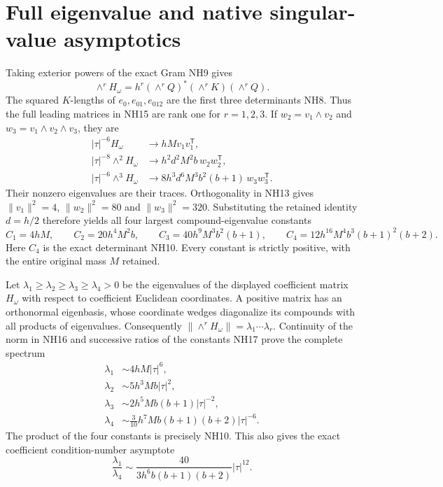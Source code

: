 \documentclass[11pt]{article}
\begin{document}
\section{Full eigenvalue and native singular-value asymptotics}
Taking exterior powers of the exact Gram NH9 gives
\[
 \wedge^rH_\omega
 =h^r(\wedge^rQ)^*(\wedge^rK)(\wedge^rQ).
 \tag{NH15}
\]
The squared $K$-lengths of $e_0,e_{01},e_{012}$ are the first
three determinants NH8. Thus the full leading matrices in
NH15 are rank one for $r=1,2,3$. If $w_2=v_1\wedge v_2$
and $w_3=v_1\wedge v_2\wedge v_3$, they are
\[
\begin{aligned}
 |\tau|^{-6}H_\omega&\longrightarrow hM v_1v_1^{\mathsf T},\\
 |\tau|^{-8}\wedge^2H_\omega&\longrightarrow
              h^2d^2M^2b\,w_2w_2^{\mathsf T},\\
 |\tau|^{-6}\wedge^3H_\omega&\longrightarrow
              8h^3d^6M^3b^2(b+1)\,w_3w_3^{\mathsf T}.
\end{aligned}\tag{NH16}
\]
Their nonzero eigenvalues are their traces. Orthogonality in
NH13 gives $\|v_1\|^2=4$, $\|w_2\|^2=80$ and
$\|w_3\|^2=320$. Substituting the retained identity $d=h/2$
therefore yields all four largest compound-eigenvalue constants
\[
 C_1=4hM,\qquad C_2=20h^4M^2b,\qquad
 C_3=40h^9M^3b^2(b+1),\qquad
 C_4=12h^{16}M^4b^3(b+1)^2(b+2).
 \tag{NH17}
\]
Here $C_4$ is the exact determinant NH10. Every constant is
strictly positive, with the entire original mass $M$ retained.

Let $\lambda_1\ge\lambda_2\ge\lambda_3\ge\lambda_4>0$
be the eigenvalues of the displayed coefficient matrix $H_\omega$
with respect to coefficient Euclidean coordinates. A positive
matrix has an orthonormal eigenbasis, whose coordinate wedges
diagonalize its compounds with all products of eigenvalues.
Consequently $\|\wedge^rH_\omega\|=\lambda_1\cdots\lambda_r$.
Continuity of the norm in NH16 and successive ratios of the
constants NH17 prove the complete spectrum
\[
\boxed{\begin{aligned}
 \lambda_1&\sim4hM|\tau|^6,\\
 \lambda_2&\sim5h^3Mb|\tau|^2,\\
 \lambda_3&\sim2h^5Mb(b+1)|\tau|^{-2},\\
 \lambda_4&\sim\tfrac3{10}h^7Mb(b+1)(b+2)|\tau|^{-6}.
\end{aligned}}\tag{NH18}
\]
The product of the four constants is precisely NH10. This
also gives the exact coefficient condition-number asymptote
\[
 \frac{\lambda_1}{\lambda_4}
 \sim\frac{40}{3h^6b(b+1)(b+2)}|\tau|^{12}.
 \tag{NH19}
\]
\end{document}
